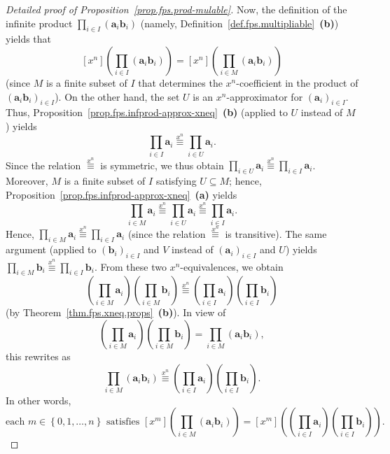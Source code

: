 \begin{proof}[Detailed proof of Proposition~\ref{prop.fps.prod-mulable}]
Now, the definition of the infinite product
$\prod_{i \in I} \left(\mathbf{a}_{i} \mathbf{b}_{i}\right)$ (namely,
Definition~\ref{def.fps.multipliable}~\textbf{(b)}) yields that
\[
\left[x^{n}\right] \left(\prod_{i \in I}
  \left(\mathbf{a}_{i} \mathbf{b}_{i}\right)\right)
= \left[x^{n}\right] \left(\prod_{i \in M}
  \left(\mathbf{a}_{i} \mathbf{b}_{i}\right)\right)
\]
(since $M$ is a finite subset of $I$ that determines the
$x^n$-coefficient in the product of
$\left(\mathbf{a}_{i} \mathbf{b}_{i}\right)_{i \in I}$). On the other
hand, the set $U$ is an $x^n$-approximator for
$\left(\mathbf{a}_{i}\right)_{i \in I}$. Thus,
Proposition~\ref{prop.fps.infprod-approx-xneq}~\textbf{(b)} (applied to
$U$ instead of $M$) yields
\[
\prod_{i \in I} \mathbf{a}_{i} \overset{x^n}{\equiv}
\prod_{i \in U} \mathbf{a}_{i}.
\]
Since the relation $\overset{x^n}{\equiv}$ is symmetric, we thus obtain
$\prod_{i \in U} \mathbf{a}_{i} \overset{x^n}{\equiv}
\prod_{i \in I} \mathbf{a}_{i}$.
Moreover, $M$ is a finite subset of $I$ satisfying $U \subseteq M$;
hence, Proposition~\ref{prop.fps.infprod-approx-xneq}~\textbf{(a)}
yields
\[
\prod_{i \in M} \mathbf{a}_{i} \overset{x^n}{\equiv}
\prod_{i \in U} \mathbf{a}_{i} \overset{x^n}{\equiv}
\prod_{i \in I} \mathbf{a}_{i}.
\]
Hence,
$\prod_{i \in M} \mathbf{a}_{i} \overset{x^n}{\equiv}
\prod_{i \in I} \mathbf{a}_{i}$
(since the relation $\overset{x^n}{\equiv}$ is transitive). The same
argument (applied to $\left(\mathbf{b}_{i}\right)_{i \in I}$ and $V$
instead of $\left(\mathbf{a}_{i}\right)_{i \in I}$ and $U$) yields
$\prod_{i \in M} \mathbf{b}_{i} \overset{x^n}{\equiv}
\prod_{i \in I} \mathbf{b}_{i}$.
From these two $x^n$-equivalences, we obtain
\[
\left(\prod_{i \in M} \mathbf{a}_{i}\right)
\left(\prod_{i \in M} \mathbf{b}_{i}\right)
\overset{x^n}{\equiv}
\left(\prod_{i \in I} \mathbf{a}_{i}\right)
\left(\prod_{i \in I} \mathbf{b}_{i}\right)
\]
(by Theorem~\ref{thm.fps.xneq.props}~\textbf{(b)}). In view of
\[
\left(\prod_{i \in M} \mathbf{a}_{i}\right)
\left(\prod_{i \in M} \mathbf{b}_{i}\right)
= \prod_{i \in M}
  \left(\mathbf{a}_{i} \mathbf{b}_{i}\right),
\]
this rewrites as
\[
\prod_{i \in M} \left(\mathbf{a}_{i} \mathbf{b}_{i}\right)
\overset{x^n}{\equiv}
\left(\prod_{i \in I} \mathbf{a}_{i}\right)
\left(\prod_{i \in I} \mathbf{b}_{i}\right).
\]
In other words,
\[
\text{each } m \in \left\{0, 1, \ldots, n\right\} \text{ satisfies }
\left[x^{m}\right] \left(\prod_{i \in M}
  \left(\mathbf{a}_{i} \mathbf{b}_{i}\right)\right)
= \left[x^{m}\right] \left(
  \left(\prod_{i \in I} \mathbf{a}_{i}\right)
  \left(\prod_{i \in I} \mathbf{b}_{i}\right)\right).
\]
\end{proof}

